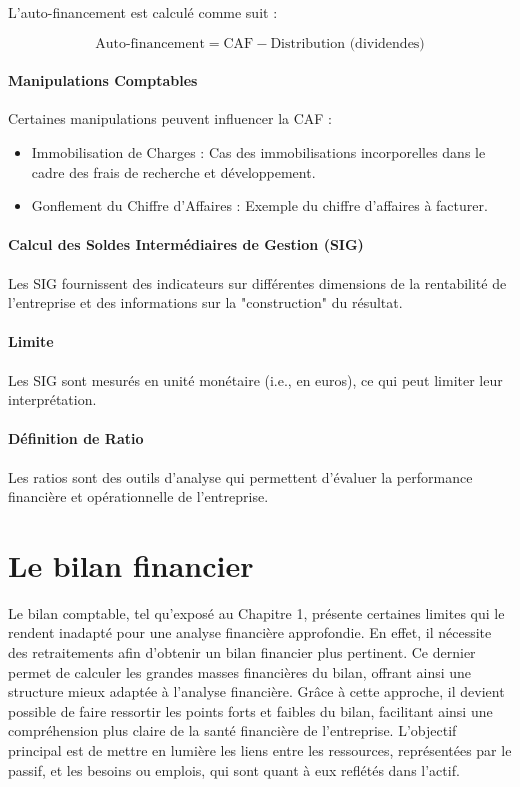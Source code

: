 \documentclass[a4paper, 12pt]{report}
\begin{document}
L'auto-financement est calculé comme suit :

\[
\text{Auto-financement} = \text{CAF} - \text{Distribution (dividendes)}
\]

\subsubsection{Manipulations Comptables}

Certaines manipulations peuvent influencer la CAF :

\begin{itemize}
	\item Immobilisation de Charges : Cas des immobilisations incorporelles dans le cadre des frais de recherche et développement.
	\item Gonflement du Chiffre d'Affaires : Exemple du chiffre d'affaires à facturer.
\end{itemize}

\subsubsection{Calcul des Soldes Intermédiaires de Gestion (SIG)}

Les SIG fournissent des indicateurs sur différentes dimensions de la rentabilité de l'entreprise et des informations sur la "construction" du résultat. 

\subsubsection{Limite}

Les SIG sont mesurés en unité monétaire (i.e., en euros), ce qui peut limiter leur interprétation. 

\subsubsection{Définition de Ratio}

Les ratios sont des outils d'analyse qui permettent d'évaluer la performance financière et opérationnelle de l'entreprise.

\chapter{Le bilan financier}


Le bilan comptable, tel qu'exposé au Chapitre 1, présente certaines limites qui le rendent inadapté pour une analyse financière approfondie. En effet, il nécessite des retraitements afin d'obtenir un bilan financier plus pertinent. Ce dernier permet de calculer les grandes masses financières du bilan, offrant ainsi une structure mieux adaptée à l'analyse financière. Grâce à cette approche, il devient possible de faire ressortir les points forts et faibles du bilan, facilitant ainsi une compréhension plus claire de la santé financière de l'entreprise. L'objectif principal est de mettre en lumière les liens entre les ressources, représentées par le passif, et les besoins ou emplois, qui sont quant à eux reflétés dans l'actif.
\end{document}
